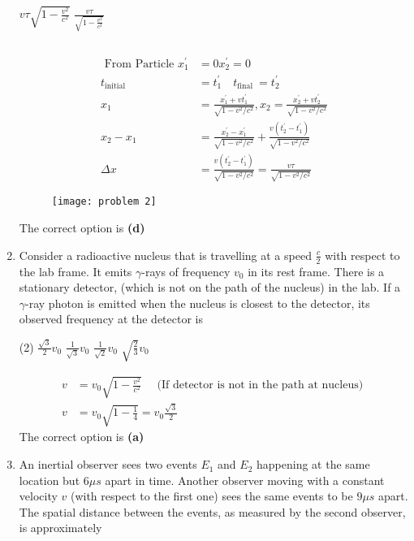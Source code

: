 \begin{enumerate}
\begin{tasks}
	\task[\textbf{C.}]$v \tau \sqrt{1-\frac{v^{2}}{c^{2}}}$
	\task[\textbf{D.}]$\frac{v \tau}{\sqrt{1-\frac{v^{2}}{c^{2}}}}$
\end{tasks}
\begin{answer}$\left. \right. $\\
	\begin{minipage}{0.5\textwidth}
	\begin{align*}
	\text { From Particle } x_{1}^{\prime}&=0 x_{2}^{\prime}=0\\
	t_{\text {initial }}&=t_{1}^{\prime} \quad t_{\text {final }}=t_{2}^{\prime}\\
	x_{1}&=\frac{x_{1}^{\prime}+v t_{1}^{\prime}}{\sqrt{1-v^{2} / c^{2}}}, x_{2}=\frac{x_{2}^{\prime}+v t_{2}^{\prime}}{\sqrt{1-v^{2} / c^{2}}}\\
	x_{2}-x_{1}&=\frac{x_{2}^{\prime}-x_{1}^{\prime}}{\sqrt{1-v^{2} / c^{2}}}+\frac{v\left(t_{2}^{\prime}-t_{1}^{\prime}\right)}{\sqrt{1-v^{2} / c^{2}}}\\
	\Delta x&=\frac{v\left(t_{2}^{\prime}-t_{1}^{\prime}\right)}{\sqrt{1-v^{2} / c^{2}}}=\frac{v \tau}{\sqrt{1-v^{2} / c^{2}}}
	\end{align*}	
	\end{minipage}
\begin{minipage}{0.5\textwidth}
	\begin{figure}[H]
		\centering
		\texttt{[image: problem 2]}
	\end{figure}
\end{minipage}
The correct option is \textbf{(d)}
\end{answer}
	\item Consider a radioactive nucleus that is travelling at a speed $\frac{c}{2}$ with respect to the lab frame. It emits $\gamma$-rays of frequency $v_{0}$ in its rest frame. There is a stationary detector, (which is not on the path of the nucleus) in the lab. If a $\gamma$-ray photon is emitted when the nucleus is closest to the detector, its observed frequency at the detector is
	{}
\begin{tasks}(2)
	\task[\textbf{A.}] $\frac{\sqrt{3}}{2} v_{0}$
	\task[\textbf{B.}]$\frac{1}{\sqrt{3}} v_{0}$
	\task[\textbf{C.}]$\frac{1}{\sqrt{2}} v_{0}$
	\task[\textbf{D.}]$\sqrt{\frac{2}{3}} v_{0}$
\end{tasks}
\begin{answer}
	\begin{align*}
	v&=v_{0} \sqrt{1-\frac{v^{2}}{c^{2}}} \quad \text { (If detector is not in the path at nucleus) }\\
	v&=v_{0} \sqrt{1-\frac{1}{4}}=v_{0} \frac{\sqrt{3}}{2}
	\end{align*}
	The correct option is \textbf{(a)}
\end{answer}
	\item An inertial observer sees two events $E_{1}$ and $E_{2}$ happening at the same location but $6 \mu s$ apart in time. Another observer moving with a constant velocity $v$ (with respect to the first one) sees the same events to be $9 \mu s$ apart. The spatial distance between the events, as measured by the second observer, is approximately
	{}


\end{enumerate}
